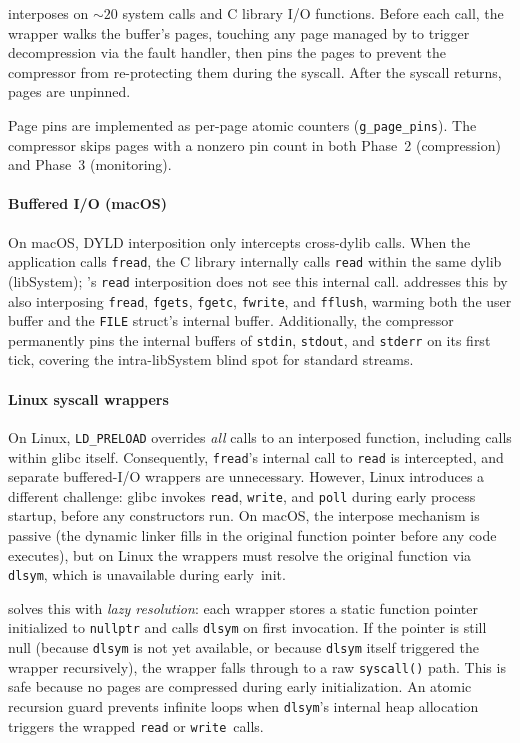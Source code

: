 \sys interposes on $\sim20$ system calls and C library I/O functions.
Before each call, the wrapper walks the buffer's pages, touching any
page managed by \sys to trigger decompression via the fault handler,
then pins the pages to prevent the compressor from re-protecting them
during the syscall.  After the syscall returns, pages are unpinned.

Page pins are implemented as per-page atomic counters
(\texttt{g\_page\_pins}).  The compressor skips pages with a nonzero
pin count in both Phase~2 (compression) and Phase~3
(monitoring).

\paragraph{Buffered I/O (macOS)}  On macOS, DYLD interposition only
intercepts cross-dylib calls.  When the application calls
\texttt{fread}, the C library internally calls \texttt{read} within
the same dylib (libSystem); \sys's \texttt{read} interposition does
not see this internal call.  \sys addresses this by also interposing
\texttt{fread}, \texttt{fgets}, \texttt{fgetc}, \texttt{fwrite}, and
\texttt{fflush}, warming both the user buffer and the
\texttt{FILE} struct's internal buffer.  Additionally, the
compressor permanently pins the internal buffers of \texttt{stdin},
\texttt{stdout}, and \texttt{stderr} on its first tick, covering
the intra-libSystem blind spot for standard streams.

\paragraph{Linux syscall wrappers}
On Linux, \texttt{LD\_PRELOAD} overrides \emph{all} calls to an
interposed function, including calls within glibc itself.
Consequently, \texttt{fread}'s internal call to \texttt{read} is
intercepted, and separate buffered-I/O wrappers are unnecessary.
However, Linux introduces a different challenge: glibc invokes
\texttt{read}, \texttt{write}, and \texttt{poll} during early
process startup, before any constructors run.  On macOS, the
interpose mechanism is passive (the dynamic linker fills in the
original function pointer before any code executes), but on Linux
the wrappers must resolve the original function via \texttt{dlsym},
which is unavailable during early~init.

\sys solves this with \emph{lazy resolution}: each wrapper stores a
static function pointer initialized to \texttt{nullptr} and calls
\texttt{dlsym} on first invocation.  If the pointer is still null
(because \texttt{dlsym} is not yet available, or because
\texttt{dlsym} itself triggered the wrapper recursively), the wrapper
falls through to a raw \texttt{syscall()} path.  This is safe because
no pages are compressed during early initialization.  An atomic
recursion guard prevents infinite loops when \texttt{dlsym}'s internal
heap allocation triggers the wrapped \texttt{read} or
\texttt{write}~calls.

